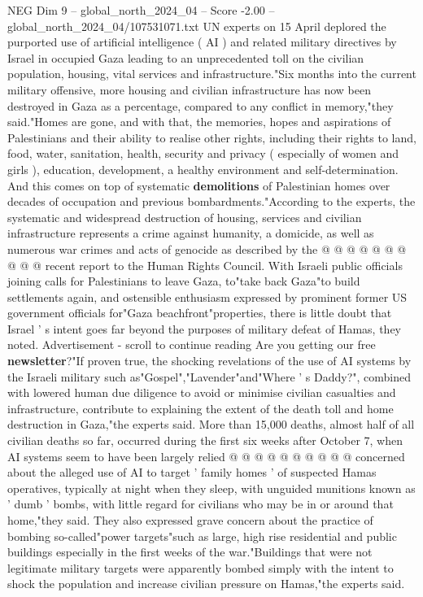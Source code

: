 \begin{textsample}{NEG Dim 9 – global\_north\_2024\_04 – Score -2.00 – global\_north\_2024\_04/107531071.txt}  \label{ex:f9_neg_219}
UN experts on 15 April deplored the purported use of artificial intelligence ( AI ) and related military directives by Israel in occupied Gaza leading to an unprecedented toll on the civilian population, housing, vital services and infrastructure."Six months into the current military offensive, more housing and civilian infrastructure has now been destroyed in Gaza as a percentage, compared to any conflict in memory,"they said."Homes are gone, and with that, the memories, hopes and aspirations of Palestinians and their ability to realise other rights, including their rights to land, food, water, sanitation, health, security and privacy ( especially of women and girls ), education, development, a healthy environment and self-determination.
And this comes on top of systematic \textbf{demolitions} of Palestinian homes over decades of occupation and previous bombardments."According to the experts, the systematic and widespread destruction of housing, services and civilian infrastructure represents a crime against humanity, a domicide, as well as numerous war crimes and acts of genocide as described by the @ @ @ @ @ @ @ @ @ @ recent report to the Human Rights Council.
With Israeli public officials joining calls for Palestinians to leave Gaza, to"take back Gaza"to build settlements again, and ostensible enthusiasm expressed by prominent former US government officials for"Gaza beachfront"properties, there is little doubt that Israel ' s intent goes far beyond the purposes of military defeat of Hamas, they noted.
Advertisement - scroll to continue reading Are you getting our free \textbf{newsletter}?"If proven true, the shocking revelations of the use of AI systems by the Israeli military such as"Gospel","Lavender"and"Where ' s Daddy?", combined with lowered human due diligence to avoid or minimise civilian casualties and infrastructure, contribute to explaining the extent of the death toll and home destruction in Gaza,"the experts said.
More than 15,000 deaths, almost half of all civilian deaths so far, occurred during the first six weeks after October 7, when AI systems seem to have been largely relied @ @ @ @ @ @ @ @ @ @ concerned about the alleged use of AI to target ' family homes ' of suspected Hamas operatives, typically at night when they sleep, with unguided munitions known as ' dumb ' bombs, with little regard for civilians who may be in or around that home,"they said.
They also expressed grave concern about the practice of bombing so-called"power targets"such as large, high rise residential and public buildings especially in the first weeks of the war."Buildings that were not legitimate military targets were apparently bombed simply with the intent to shock the population and increase civilian pressure on Hamas,"the experts said.

\end{textsample}
